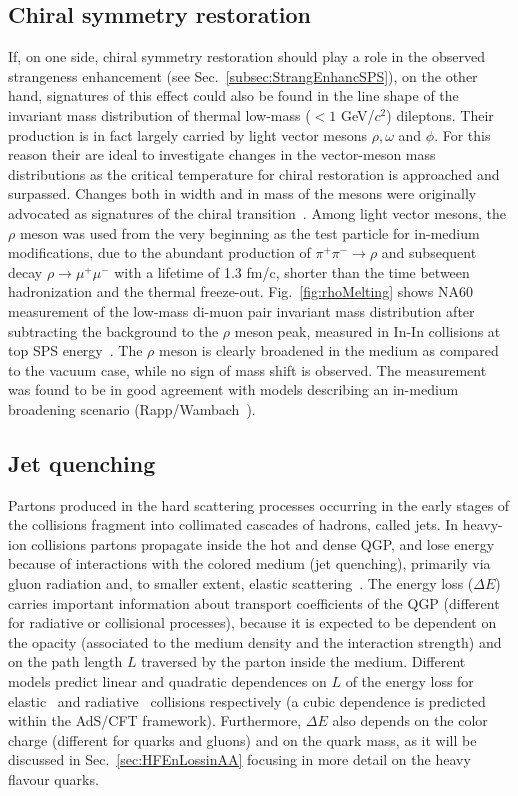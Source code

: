 \subsection{Chiral symmetry restoration}
If, on one side, chiral symmetry restoration should play a role in the 
observed strangeness enhancement (see Sec.~\ref{subsec:StrangEnhancSPS}),
on the other hand, signatures of this effect could also be found in the line shape of the
invariant mass distribution of thermal low-mass ($< 1$ GeV/$c^2$) dileptons.
Their production is in fact largely carried by light 
vector mesons $\rho, \omega$ and $\phi$. For this reason their are ideal to investigate
changes in the vector-meson mass distributions as the critical temperature for chiral
restoration is approached and surpassed. Changes both in width and in mass of
the mesons were originally advocated as signatures of the chiral transition~\cite{Pisarski:1981mq}. 
Among light vector mesons, the $\rho$ meson was used from the very beginning as the test particle for in-medium 
modifications, due to the abundant production
of $\pi^+ \pi^- \rightarrow \rho$ and subsequent decay $\rho \rightarrow \mu^+ \mu^- $ 
with a lifetime of 1.3 fm/c, shorter than the time between hadronization and the thermal freeze-out. 
Fig.~\ref{fig:rhoMelting}  shows NA60 measurement of the 
low-mass di-muon pair invariant mass distribution after 
subtracting the background to the $\rho$ meson peak, 
measured in In-In collisions at top SPS energy~\cite{Damjanovic:2005ni}. The $\rho$ meson is
clearly broadened in the medium as compared to the vacuum case, 
while no sign of mass shift is observed. The measurement
was found to be in good agreement with models describing an in-medium broadening 
scenario (Rapp/Wambach~\cite{Rapp:2012zq}).

\subsection{Jet quenching}
\label{sec:JetQuenching}
Partons produced in the hard scattering processes occurring in the early stages of the 
collisions fragment into collimated cascades of hadrons, called jets. 
In heavy-ion collisions partons propagate inside the hot and dense QGP,
 and lose energy because of interactions with the colored medium 
 (jet quenching), primarily via gluon radiation and, to smaller extent, 
 elastic scattering~\cite{Qin:2015srf}. The energy loss ($\Delta E$) carries 
 important information about transport coefficients 
 of the QGP (different for radiative or collisional processes), because it
  is expected to be dependent on the opacity 
 (associated to the medium density and the interaction strength) 
 and on the path length $L$ traversed by the parton inside the medium.
  Different models predict linear and quadratic dependences on $L$ 
  of the energy loss for elastic~\cite{Thoma:1990fm} and radiative~\cite{Baier:1996sk} 
  collisions respectively (a cubic dependence is predicted within the 
  AdS/CFT framework). Furthermore, $\Delta E$ also depends on the 
  color charge (different for quarks and gluons) and on the quark mass, 
  as it will be discussed in Sec.~\ref{sec:HFEnLossinAA} focusing in more detail on the heavy flavour quarks.\\

